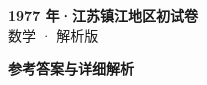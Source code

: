 \documentclass[zihao=-4, a4paper]{ctexart}
\begin{document}
\begin{center}
  {\Large\bfseries 1977 年·江苏镇江地区初试卷}\\[4pt]
  {\large 数学 · 解析版}
\end{center}
\medskip
{}

\clearpage
{}
\begin{center}{\Large\bfseries 参考答案与详细解析}\end{center}
\medskip

\end{document}
